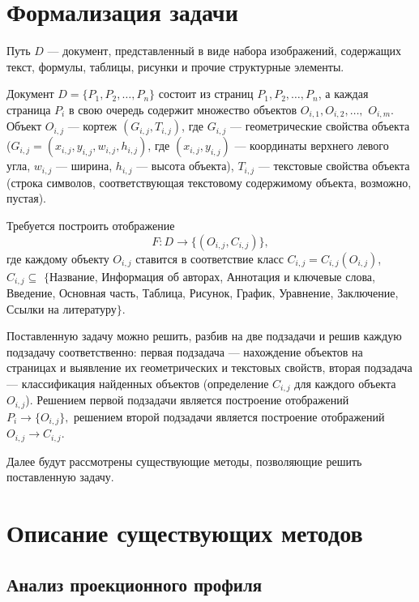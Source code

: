 \section{Формализация задачи}

Путь $ D $ --- документ, представленный в виде набора изображений, содержащих текст, формулы, таблицы, рисунки и прочие структурные элементы.

Документ $D = \{ P_1, P_2 , \dots, P_n \} $ состоит из страниц $ P_1, P_2, \dots, P_n $, а каждая страница
$ P_i $
в свою очередь содержит множество объектов $ O_{i,1}, O_{i,2}, \dots, $ $O_{i,m} $.
Объект $O_{i,j}$ --- кортеж $(G_{i,j}, T_{i,j})$, где $G_{i,j}$ --- геометрические свойства объекта ($G_{i,j} = (x_{i,j}, y_{i,j}, w_{i,j}, h_{i,j})$, где $(x_{i,j}, y_{i,j})$ --- координаты верхнего левого угла, $w_{i,j}$ --- ширина, $h_{i,j}$ --- высота объекта), $T_{i,j}$ --- текстовые свойства объекта (строка символов, соответствующая текстовому содержимому объекта, возможно, пустая).

Требуется построить отображение $$ F : D \to \{(O_{i,j}, C_{i,j})\}, $$ где каждому объекту $O_{i,j}$ ставится в соответствие класс $C_{i,j} = C_{i,j}(O_{i,j})$, $C_{i,j} \subseteq$ $\{${Название, Информация об авторах, Аннотация и ключевые слова, Введение, Основная часть, Таблица, Рисунок, График, Уравнение, Заключение, Ссылки на литературу}$\}$.

Поставленную задачу можно решить, разбив на две подзадачи и решив каждую подзадачу соответственно: первая подзадача --- нахождение объектов на страницах и выявление их геометрических и текстовых свойств, вторая подзадача --- классификация найденных объектов (определение $C_{i,j}$ для каждого объекта $O_{i,j}$).
Решением первой подзадачи является построение отображений
$
P_i \to \{ O_{i,j} \},
$
решением второй подзадачи является построение отображений
$
O_{i,j} \to C_{i,j}.
$

Далее будут рассмотрены существующие методы, позволяющие решить поставленную задачу.

\section{Описание существующих методов}

\subsection{Анализ проекционного профиля}

